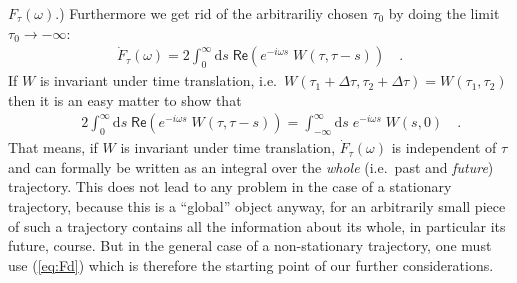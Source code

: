 \documentclass[a4paper,12pt]{article}
\renewcommand{\Re}{\mathsf{Re}}
\newcommand{\Fd}{\dot F_{\tau}(\omega)}
\renewcommand{\d}{\mathrm{d}}
\begin{document}
$F_\tau (\omega)$.)
Furthermore we get rid
of the arbitrariliy chosen $\tau_0$ by doing the limit $\tau_0\to-\infty$:
\begin{eqnarray}
\label{eq:Fd}
\Fd=2\int_0^\infty\d s\;\Re\left(e^{-i\omega s}\;W(\tau,\tau-s)\right)\quad.
\end{eqnarray}
If $W$ is invariant under time translation, i.e.\
$W(\tau_1+\Delta\tau,\tau_2+\Delta\tau)=W(\tau_1,\tau_2)$ then it is an easy matter
to show that 
\begin{eqnarray}
\label{eq:ttinv}
&&2\int^{\infty}_0 \d s\; \Re\left( e^{-i\omega s}\; 
W(\tau,\tau-s)\right)
=\int_{-\infty}^{\infty}\d s\;e^{-i\omega s}\;W(s,0)\quad.
\end{eqnarray}
That means, if $W$ is invariant under time translation, $\Fd$ is 
independent of $\tau$ and can formally be written as 
an integral over the {\em whole} (i.e.\ past and {\em future}) trajectory.
This does not lead to any problem in the case of a stationary trajectory, because
this is a ``global'' object anyway, for
an arbitrarily small piece of such a trajectory contains all the information 
about its whole, in particular its future, course.
But in the general case of a non-stationary trajectory, one must 
use (\ref{eq:Fd}) which is therefore the starting point of our further considerations.

\bigskip
\end{document}
